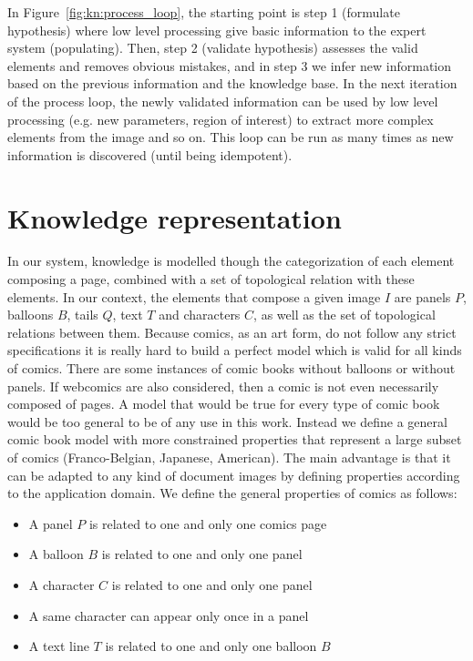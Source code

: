 In Figure~\ref{fig:kn:process_loop}, the starting point is step 1 (formulate hypothesis) where low level processing give basic information to the expert system (populating).
Then, step 2 (validate hypothesis) assesses the valid elements and removes obvious mistakes, and in step 3 we infer new information based on the previous information and the knowledge base.
In the next iteration of the process loop, the newly validated information can be used by low level processing (e.g. new parameters, region of interest) to extract more complex elements from the image and so on.
This loop can be run as many times as new information is discovered (until being idempotent).

\section{Knowledge representation} %
\label{sec:kn:knowledge_representation}
In our system, knowledge is modelled though the categorization of each element composing a page, combined with a set of topological relation with these elements.
In our context, the elements that compose a given image $I$ are panels $P$, balloons $B$, tails $Q$, text $T$ and characters $C$, as well as the set of topological relations between them.
Because comics, as an art form, do not follow any strict specifications it is really hard to build a perfect model which is valid for all kinds of comics.
There are some instances of comic books without balloons or without panels.
If webcomics are also considered, then a comic is not even necessarily composed of pages.
A model that would be true for every type of comic book would be too general to be of any use in this work.
Instead we define a general comic book model with more constrained properties that represent a large subset of comics (Franco-Belgian, Japanese, American).
The main advantage is that it can be adapted to any kind of document images by defining properties according to the application domain.
We define the general properties of comics as follows:

\begin{itemize}
  \item A panel $P$ is related to one and only one comics page
  \item A balloon $B$ is related to one and only one panel
  \item A character $C$ is related to one and only one panel
  \item A same character can appear only once in a panel
  \item A text line $T$ is related to one and only one balloon $B$
\end{itemize}

